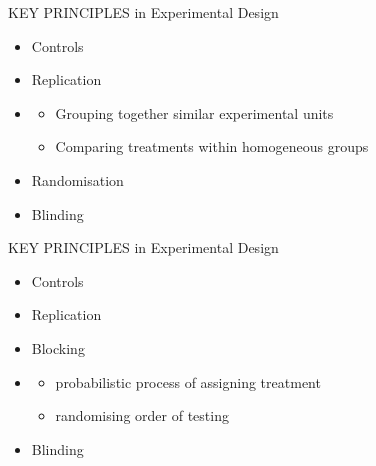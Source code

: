 \documentclass{beamer}
\begin{document}
\begin{frame}{KEY PRINCIPLES in Experimental Design}

\begin{alertblock}{}
 \begin{itemize}
  \item Controls
  \item Replication
  \item {\color{red}{Blocking}}
    \begin{itemize}
     \item Grouping together similar experimental units
     \item Comparing treatments within homogeneous groups
    \end{itemize}
  \item Randomisation
  \item Blinding
 \end{itemize}

\end{alertblock}

\end{frame}


\begin{frame}{KEY PRINCIPLES in Experimental Design}

\begin{alertblock}{}
 \begin{itemize}
  \item Controls
  \item Replication
  \item Blocking
  \item {\color{red}{Randomisation}}
    \begin{itemize}
     \item probabilistic process of assigning treatment
     \item randomising order of testing
    \end{itemize}
  \item Blinding
 \end{itemize}

\end{alertblock}

\end{frame}
\end{document}

